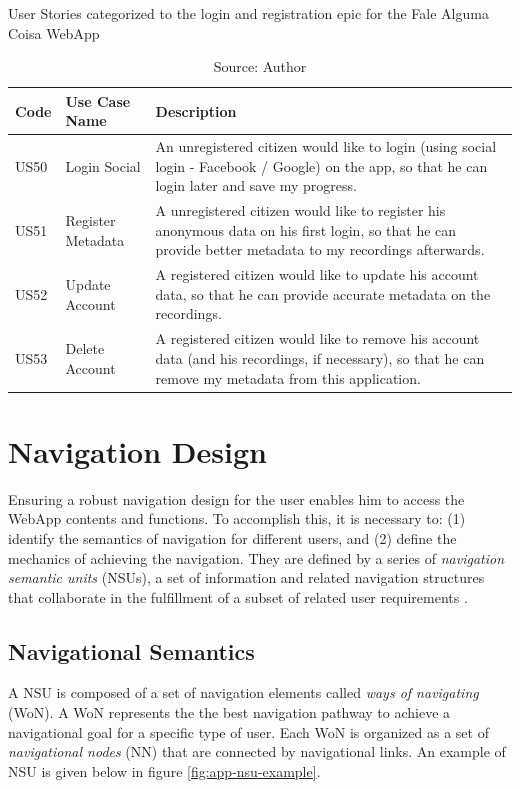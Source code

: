 \begin{table}[h]
\caption{User Stories categorized to the login and registration epic for the Fale Alguma Coisa WebApp}
\label{tab:falealgumacoisa-simplified-login-and-registration}
\centering
\begin{tabular}{|p{1cm}|p{3cm}|p{10cm}|}
\hline
    Code & Use Case Name & Description \\ \hline
    US50 & Login Social & An unregistered citizen would like to login (using social login - Facebook / Google) on the app, so that he can login later and save my progress. \\ \hline
    US51 & Register Metadata & A unregistered citizen would like to register his anonymous data on his first login, so that he can provide better metadata to my recordings afterwards. \\ \hline
    US52 & Update Account & A registered citizen would like to update his account data, so that he can provide accurate metadata on the recordings. \\ \hline
    US53 & Delete Account & A registered citizen would like to remove his account data (and his recordings, if necessary), so that he can remove my metadata from this application. \\ \hline
\end{tabular}
\caption*{Source: Author}
\end{table}

\clearpage
\section{Navigation Design}
\label{sec:navigation-design}

Ensuring a robust navigation design for the user enables him to access the WebApp contents and functions. To accomplish this, it is necessary to: (1) identify the semantics of navigation for different users, and (2) define the mechanics of achieving the navigation. They are defined by a series of \textit{navigation semantic units} (NSUs), a set of information and related navigation structures that collaborate in the fulfillment of a subset of related user requirements \cite{conallen2003building}.

\subsection{Navigational Semantics}

A NSU is composed of a set of navigation elements called \textit{ways of navigating} (WoN). A WoN represents the the best navigation pathway to achieve a navigational goal for a specific type of user. Each WoN is organized as a set of \textit{navigational nodes} (NN) that are connected by navigational links. An example of NSU is given below in figure \ref{fig:app-nsu-example}.

